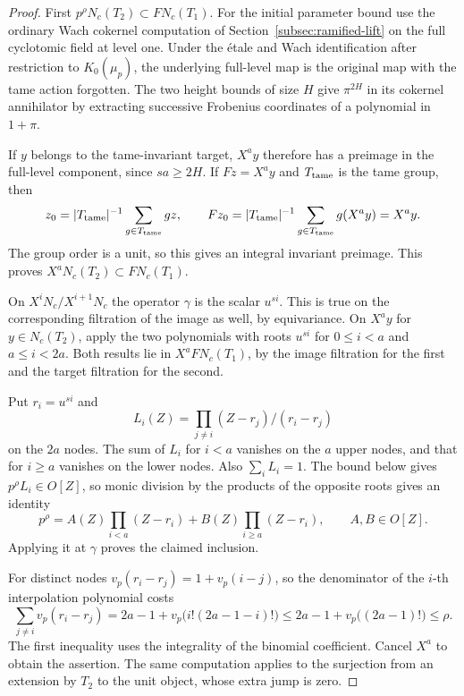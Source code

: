 \begin{proof}
First \(p^\rho N_c(T_2)\subset F N_c(T_1)\). For the initial parameter
bound use the ordinary Wach cokernel computation of
Section~\ref{subsec:ramified-lift} on the full cyclotomic field at level
one. Under the étale and Wach identification after restriction to
\(K_0(\mu_p)\), the underlying full-level map is the original map
with the tame action forgotten. The two height bounds of size \(H\)
give \(\pi^{2H}\) in its cokernel annihilator by extracting successive
Frobenius coordinates of a polynomial in \(1+\pi\).

If \(y\) belongs
to the tame-invariant target, \(X^a y\) therefore has a preimage in
the full-level component, since \(sa\ge 2H\). If \(Fz=X^a y\) and \(T_{\rm tame}\) is the tame group, then
\[
 z_0=|T_{\rm tame}|^{-1}\sum_{g\in T_{\rm tame}}gz,\qquad
 Fz_0=|T_{\rm tame}|^{-1}\sum_{g\in T_{\rm tame}}g(X^ay)=X^ay.
\]
The group order is a unit, so this gives an integral invariant preimage. This proves
\(X^a N_c(T_2)\subset F N_c(T_1)\).

On \(X^iN_c/X^{i+1}N_c\) the operator \(\gamma\) is the scalar
\(u^{si}\). This is true on the corresponding filtration of the
image as well, by equivariance. On \(X^ay\) for \(y\in N_c(T_2)\),
apply the two polynomials with roots \(u^{si}\) for \(0\le i<a\)
and \(a\le i<2a\). Both results lie in \(X^aFN_c(T_1)\), by the
image filtration for the first and the target filtration for the
second.

Put \(r_i=u^{si}\) and
\[
 L_i(Z)=\prod_{j\ne i}(Z-r_j)/(r_i-r_j)
\]
on the \(2a\) nodes.
The sum of \(L_i\) for \(i<a\) vanishes on the \(a\) upper
nodes, and that for \(i\ge a\) vanishes on the lower nodes.
Also \(\sum_i L_i=1\). The bound below gives \(p^\rho L_i\in O[Z]\),
so monic division by the products of the opposite roots
gives an identity
\[
         p^\rho=A(Z)\prod_{i<a}(Z-r_i)
                    +B(Z)\prod_{i\ge a}(Z-r_i),
                    \qquad A,B\in O[Z].
\]
Applying it at \(\gamma\) proves the claimed inclusion.

For distinct nodes \(v_p(r_i-r_j)=1+v_p(i-j)\), so the
denominator of the \(i\)-th interpolation polynomial costs
\[
 \sum_{j\ne i}v_p(r_i-r_j)
 =2a-1+v_p\bigl(i!(2a-1-i)!\bigr)
 \le 2a-1+v_p\bigl((2a-1)!\bigr)\le\rho .
\]
The first inequality uses the integrality of the binomial coefficient.
Cancel \(X^a\) to obtain the assertion. The same computation applies
to the surjection from an extension by \(T_2\) to the unit object,
whose extra jump is zero.


\end{proof}
